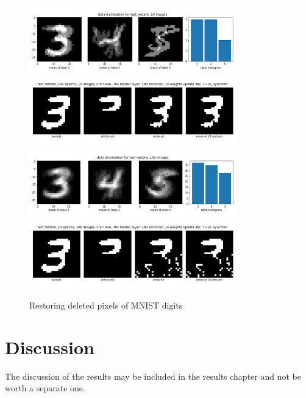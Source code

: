 \documentclass[12pt,twoside]{article}
\theoremstyle{plain}
\theoremstyle{definition}
\theoremstyle{remark}
\begin{document}
\begin{figure}[h!]
	\begin{center}
	\includegraphics[trim={0cm 0.5cm 0cm 0cm},clip,width=0.8\textwidth]{src/data_distribution_10_images}
	\includegraphics[trim={0cm 1.0cm 0cm 0cm},clip,width=0.8\textwidth]{src/test_restore_10_images}
	\includegraphics[trim={0cm 0.5cm 0cm 0cm},clip,width=0.8\textwidth]{src/data_distribution_100_images}
	\includegraphics[trim={0cm 1.0cm 0cm 0cm},clip,width=0.8\textwidth]{src/test_restore_100_images}
	\end{center}
	\caption{Restoring deleted pixels of MNIST digits}\label{fig:test_restore}
\end{figure}


\section{Discussion}
\label{sec:discuss}

The discussion of the results may be included in the results chapter and not be worth a separate one. %
\end{document}
